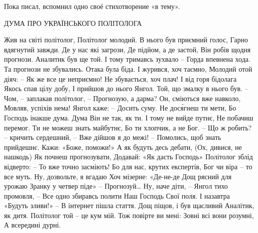 Пока писал, вспомнил одно своё стихотворение «в тему».   

ДУМА ПРО УКРАЇНСЬКОГО ПОЛІТОЛОГА

Жив на світі політолог,
Політолог молодий.
В нього був приємний голос,
Гарно вдягнутий завжди.
Де у нас які загрози,
Де підйом, а де застой,
Він робів щодня прогнози.
Аналитик був ще той.
І тому тримавсь зухвало – 
Горда впевнена хода.
Та прогнози не збувались.
Отака була біда.
І журився, хоч таємно,
Молодий отой діяч:
– Як же все це неприємно!
Не збувається, хоч плач!
І від горя бідолага
Якось спав цілу добу,
І прийшов до нього Янгол.
Той, що змалку в нього був.
– Чом, – заплакав політолог, – 
Прогнозую, а дарма?
Он, сміються вже навколо,
Мовляв, успіхів нема!
Янгол каже: – Досить суму.
Не дося̀гнеш ти мети,
Бо Господь інакше дума.
Дума Він не так, як ти.
І тому не вийде путнє,
Не побачиш перемог.
Ти не можеш знать майбутнє,
Бо ти хлопчик, а не Бог.
– Що ж робить? – кричить сердешний, – 
Вже дійшов я до межі!
– Помолись, щоб знать прийдешнє.
Кажи: «Боже, поможи!»
А як будуть десь  дебати,
(Ох, дивися, не нашкодь)
Як почнеш прогнозувати,
Додавай: «Як дасть Господь»
Політолог зблід відверто:
– То вже точно засміють!
Бо для нас, крутих експертів,
Бог чи віра – то все муть.
Ну, дозвольте, я вгадаю
Хоч мізерне: «Де-не-де
Дощ рясний для урожаю
Зранку у четвер піде»
– Прогнозуй… Ну, наче діти, – 
Янгол тихо промовля, – 
Все одно збиравсь полити
Наш Господь Свої поля.
І назавтра «Будуть зливи!» – 
В інтернет пішла стаття.
Дощ піщов, і був щасливий
Аналітик, як дитя. 
Політолог той – це кум мій.
Тож повірте ви мені:
Зовні всі вони розумні,
А всередині дурні.
